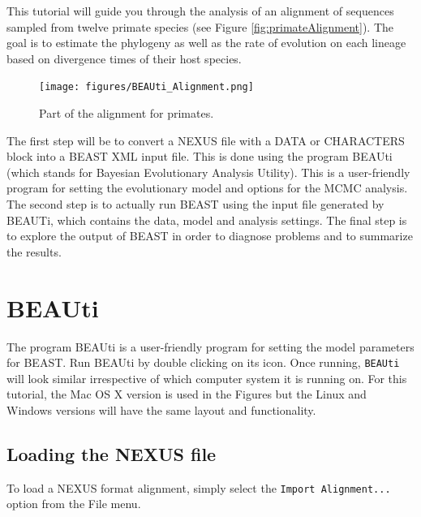 \documentclass[11pt]{article}
\newcommand{\TODO}[1]{}
\theoremstyle{plain}%
\theoremstyle{definition}
\theoremstyle{remark}
\begin{document}
This tutorial will guide you through the analysis of an alignment of sequences sampled from twelve primate species (see Figure \ref{fig:primateAlignment}). The goal is to estimate the phylogeny as well as the rate of evolution on each lineage based on divergence times of their host species. 

\begin{figure}	

\texttt{[image: figures/BEAUti\_Alignment.png]}

\caption{Part of the alignment for primates.\label{fig:primateAlignment}}
\label{fig:BEAUti_ImportNexus}
\end{figure}

The first step will be to convert a NEXUS file with a DATA or CHARACTERS block into a BEAST XML input file. This is done using the program BEAUti (which stands for Bayesian Evolutionary Analysis Utility). 
This is a user-friendly program for setting the evolutionary model and options for the MCMC analysis. 
The second step is to actually run BEAST using the input file generated by BEAUTi,  which
contains the data, model and analysis settings. 
The final step is to explore the output of BEAST in order to diagnose problems and to summarize the results.

\section{BEAUti}

The program BEAUti is a user-friendly program for setting the
model parameters for BEAST. Run BEAUti by double clicking on its icon. Once running, \texttt{BEAUti} will look similar irrespective
of which computer system it is running on. For this tutorial, the Mac OS X version is used in the Figures but
the Linux and Windows versions will have the same layout and functionality.

\TODO{Provide instructions for executing BEAUti  in a Linux environment.}

\subsection{Loading the NEXUS file }

To load a NEXUS format alignment, simply select the \texttt{Import
Alignment...} option from the File menu. 

%
%
\end{document}

